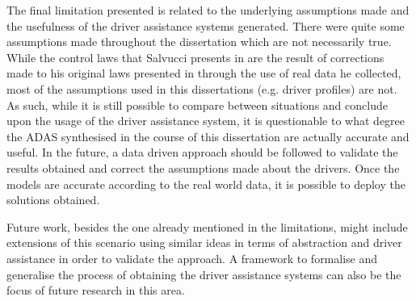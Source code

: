 The final limitation presented is related to the underlying assumptions made and the usefulness of the driver assistance systems generated. There were quite some assumptions made throughout the dissertation which are not necessarily true. While the control laws that Salvucci presents in \cite{salvucci_1} are the result of corrections made to his original laws presented in \cite{salvucci_0} through the use of real data he collected, most of the assumptions used in this dissertations (e.g. driver profiles) are not. As such, while it is still possible to compare between situations and conclude upon the usage of the driver assistance system, it is questionable to what degree the ADAS synthesised in the course of this dissertation are actually accurate and useful. In the future, a data driven approach should be followed to validate the results obtained and correct the assumptions made about the drivers. Once the models are accurate according to the real world data, it is possible to deploy the solutions obtained.

Future work, besides the one already mentioned in the limitations, might include extensions of this scenario using similar ideas in terms of abstraction and driver assistance in order to validate the approach. A framework to formalise and generalise the process of obtaining the driver assistance systems can also be the focus of future research in this area. 








